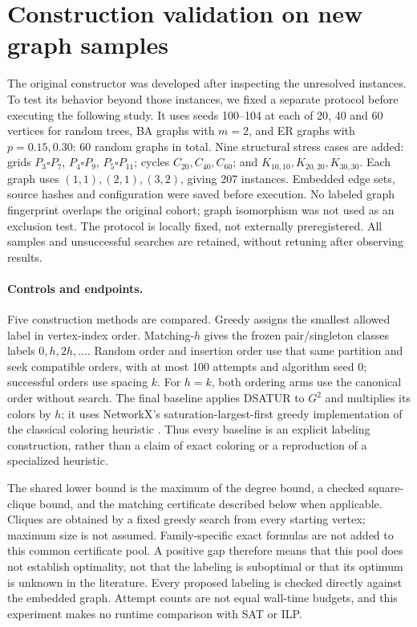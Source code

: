 \section{Construction validation on new graph samples}
\label{sec:certificate-validation}
The original constructor was developed after inspecting the unresolved
instances. To test its behavior beyond those instances, we fixed a
separate protocol before executing the following study. It uses seeds
100--104 at each of 20, 40 and 60 vertices for random trees, BA graphs
with $m=2$, and ER graphs with $p=0.15,0.30$: 60 random graphs in total.
Nine structural stress cases are added: grids $P_3\square P_7$,
$P_4\square P_9$, $P_5\square P_{11}$; cycles $C_{20},C_{40},C_{60}$;
and $K_{10,10},K_{20,20},K_{30,30}$. Each graph uses $(1,1),(2,1),(3,2)$,
giving 207 instances. Embedded edge sets, source hashes and configuration
were saved before execution. No labeled graph fingerprint overlaps the
original cohort; graph isomorphism was not used as an exclusion test.
The protocol is locally fixed, not externally preregistered. All samples
and unsuccessful searches are retained, without retuning after observing results.

\paragraph{Controls and endpoints.}
Five construction methods are compared. Greedy assigns the smallest
allowed label in vertex-index order. Matching-$h$ gives the frozen
pair/singleton classes labels $0,h,2h,\ldots$. Random order and insertion
order use that same partition and seek compatible orders, with at most
100 attempts and algorithm seed 0; successful orders use spacing $k$.
For $h=k$, both ordering arms use the canonical order without search.
The final baseline applies DSATUR to $G^2$ and multiplies its colors by
$h$; it uses NetworkX's saturation-largest-first greedy implementation
of the classical coloring heuristic \cite{brelaz1979coloring}.
Thus every baseline is an explicit labeling construction, rather than a
claim of exact coloring or a reproduction of a specialized heuristic.

The shared lower bound is the maximum of the degree bound, a checked
square-clique bound, and the matching certificate described below when
applicable. Cliques are obtained by a fixed greedy search from every
starting vertex; maximum size is not assumed. Family-specific exact
formulas are not added to this common certificate pool. A positive gap
therefore means that this pool does not establish optimality, not that
the labeling is suboptimal or that its optimum is unknown in the literature.
Every proposed labeling is checked directly against the embedded graph.
Attempt counts are not equal wall-time budgets, and this experiment makes
no runtime comparison with SAT or ILP.

